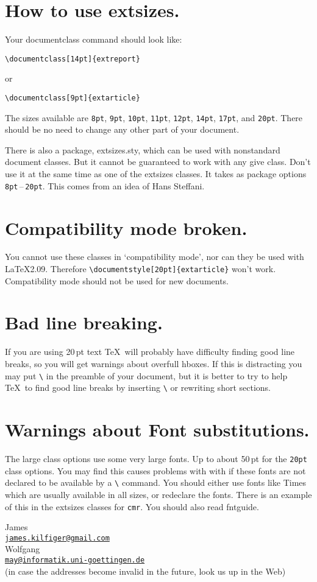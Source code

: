 \documentclass[DIV=9, headings=normal, pagesize=auto]{scrartcl}
\makeatletter
\newcommand*{\mail}[1]{\href{mailto:#1}{\texttt{#1}}}
\newcommand*{\pkg}[1]{\textsf{#1}}
\newcommand*{\cls}[1]{\textsf{#1}}
\newcommand*{\cs}[1]{\texttt{\textbackslash#1}}
\newcommand*{\cmd}[1]{\cs{\expandafter\@gobble\string#1}}
\newcommand*{\opt}[1]{\texttt{#1}}
\makeatother
\begin{document}
\section{How to use \cls{extsizes}.}

Your documentclass command should look like:
%
\begin{verbatim}
\documentclass[14pt]{extreport}
\end{verbatim}
%
or
%
\begin{verbatim}
\documentclass[9pt]{extarticle}
\end{verbatim}
%
The sizes available are \opt{8pt}, \opt{9pt}, \opt{10pt}, \opt{11pt}, \opt{12pt}, \opt{14pt}, \opt{17pt}, and \opt{20pt}.
There should be no need to change any other part of your document.

There is also a package, \pkg{extsizes.sty}, which can be used with
nonstandard document classes.  But it cannot be guaranteed to work with
any give class.  Don't use it at the same time as one of the \cls{extsizes}
classes. It takes as package options \opt{8pt}\,--\,\opt{20pt}.  This comes from an idea
of Hans Steffani.


\section{Compatibility mode broken.}

You cannot use these classes in `compatibility mode', nor can they be
used with \LaTeX2.09.  Therefore \verb+\documentstyle[20pt]{extarticle}+ won't
work.  Compatibility mode should not be used for new documents.


\section{Bad line breaking.}

If you are using 20\,pt text \TeX\ will probably have difficulty finding
good line breaks, so you will get warnings about overfull hboxes.  
If this is distracting you may put \cmd{\sloppy} in the preamble of your
document, but it is better to try to help \TeX\ to find good line breaks
by inserting \cmd{\-} or rewriting short sections.


\section{Warnings about Font substitutions.}

The large class options use some very large fonts. Up to about 50\,pt for
the \opt{20pt} class options.  You may find this causes problems with with
if these fonts are not declared to be available by a \cmd{\DeclareFontShape}
command.  You should either use fonts like \pkg{Times} which are usually
available in all sizes, or redeclare the fonts.  There is an example of
this in the \cls{extsizes} classes for \texttt{cmr}.  You should also read \pkg{fntguide}.

\bigskip

\begin{flushleft}
James\\
\quad\mail{james.kilfiger@gmail.com}\\
Wolfgang\\
\quad\mail{may@informatik.uni-goettingen.de}\\
(in case the addresses become invalid in the future, 
look us up in the Web)
\end{flushleft}
\end{document}
